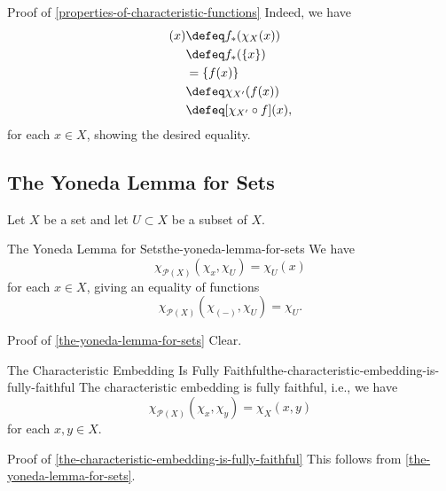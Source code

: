 \begin{Proof}{Proof of \cref{properties-of-characteristic-functions}}
    Indeed, we have
    \begin{align*}
        [f_{*}\circ\chi_{X}](x) &\defeq f_{*}(\chi_{X}(x))\\%
                                &\defeq f_{*}(\{x\})\\%
                                &=      \{f(x)\}\\%
                                &\defeq \chi_{X'}(f(x))\\%
                                &\defeq [\chi_{X'}\circ f](x),%
    \end{align*}
    for each $x\in X$, showing the desired equality.
\end{Proof}
\subsection{The Yoneda Lemma for Sets}\label{subsection-the-yoneda-lemma-for-sets}
Let $X$ be a set and let $U\subset X$ be a subset of $X$.%
\begin{proposition}{The Yoneda Lemma for Sets}{the-yoneda-lemma-for-sets}%
    We have
    \[
        \chi_{\mathcal{P}(X)}(\chi_{x},\chi_{U})%
        =%
        \chi_{U}(x)%
    \]%
    for each $x\in X$, giving an equality of functions
    \[
        \chi_{\mathcal{P}(X)}(\chi_{(-)},\chi_{U})%
        =%
        \chi_{U}.%
    \]%
\end{proposition}
\begin{Proof}{Proof of \cref{the-yoneda-lemma-for-sets}}%
    Clear.
\end{Proof}
\begin{corollary}{The Characteristic Embedding Is Fully Faithful}{the-characteristic-embedding-is-fully-faithful}%
    The characteristic embedding is fully faithful, i.e., we have
    \[
        \chi_{\mathcal{P}(X)}(\chi_{x},\chi_{y})%
        =%
        \chi_{X}(x,y)
    \]%
    for each $x,y\in X$.
\end{corollary}
\begin{Proof}{Proof of \cref{the-characteristic-embedding-is-fully-faithful}}%
    This follows from \cref{the-yoneda-lemma-for-sets}.
\end{Proof}
